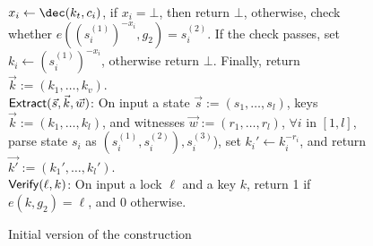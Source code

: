 \begin{figure}[htb]
{{			$x_i \gets \dec(k_t, c_i)$, if $x_i = \bot$, then return $\bot$, otherwise, 
			check whether $e((s_i^{(1)})^{-x_i},g_2) = s_i^{(2)}$. If the check passes, set 
			$k_i \gets (s_i^{(1)})^{-x_i}$, otherwise return $\bot$. Finally, return $\vec{k} := 
			(k_1,\ldots,k_v)$. \\
			\underline{$\mathsf{Extract}(\vec{s}, \vec{k}, \vec{w})$}: On input a state $\vec{s} := 
			(s_1,\ldots,s_l)$, keys $\vec{k} := (k_1,\ldots,k_l)$, and witnesses 
			$\vec{w} := (r_1,\ldots,r_l)$, $\forall i$ in $[1,l]$, parse state $s_i$ as 
			$(s_i^{(1)}, s_i^{(2)}), s_i^{(3)}$), set $k_i' \gets k_i^{-r_i}$, and return 
			$\vec{k'} := (k_1',\ldots,k_l')$. \\
			\underline{$\mathsf{Verify}(\ell, k)$}: On input a lock $\ell$ and a key $k$, return 1 
			if $e(k, g_2) = \ell$, and 0 otherwise.
		}
	}
	\caption{Initial version of the construction}
\end{figure}

